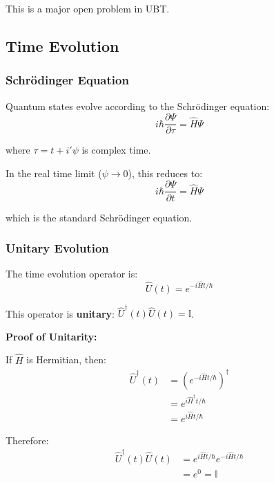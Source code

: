 This is a major open problem in UBT.

\subsection{Time Evolution}

\subsubsection{Schrödinger Equation}

Quantum states evolve according to the Schrödinger equation:
\begin{equation}
i\hbar \frac{\partial \Psi}{\partial \tau} = \hat{H} \Psi
\label{eq:schrodinger}
\end{equation}

where $\tau = t + i' \psi$ is complex time.

In the real time limit ($\psi \to 0$), this reduces to:
\begin{equation}
i\hbar \frac{\partial \Psi}{\partial t} = \hat{H} \Psi
\end{equation}

which is the standard Schrödinger equation.

\subsubsection{Unitary Evolution}

The time evolution operator is:
\begin{equation}
\hat{U}(t) = e^{-i\hat{H}t/\hbar}
\end{equation}

This operator is \textbf{unitary}: $\hat{U}^{\dagger}(t) \hat{U}(t) = \mathbb{I}$.

\textbf{Proof of Unitarity:}

If $\hat{H}$ is Hermitian, then:
\begin{align}
\hat{U}^{\dagger}(t) &= \left(e^{-i\hat{H}t/\hbar}\right)^{\dagger} \\
&= e^{i\hat{H}^{\dagger}t/\hbar} \\
&= e^{i\hat{H}t/\hbar}
\end{align}

Therefore:
\begin{align}
\hat{U}^{\dagger}(t) \hat{U}(t) &= e^{i\hat{H}t/\hbar} e^{-i\hat{H}t/\hbar} \\
&= e^0 = \mathbb{I}
\end{align}

